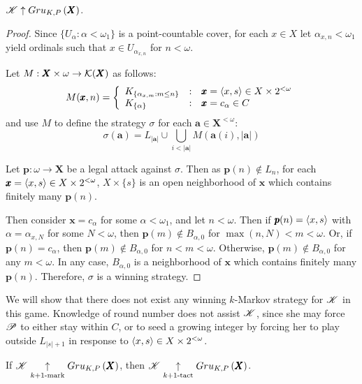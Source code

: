 \begin{thm}
  $\mathscr{K}\uparrow Gru_{K,P}\left({\pmb X}\right)$.
\end{thm}

\begin{proof}
  Since $\{U_\alpha:\alpha<\omega_1\}$ is a point-countable cover,
  for each $x\in X$ let $\alpha_{x,n}<\omega_1$ yield
  ordinals such that $x\in U_{\alpha_{x,n}}$ for $n<\omega$.

  Let $M:\pmb X\times \omega\to \mathcal{K}(\pmb X)$ as follows:
    \[
      M(\pmb x,n)
        =
      \left\{
        \begin{array}{lcl}
          K_{\{\alpha_{x,m}:m\leq n\}}
        & : &
          \pmb x = \langle x,s\rangle \in X\times 2^{<\omega}
        \\
          K_{\{\alpha\}}
        & : &
          \pmb x = c_\alpha \in C
        \end{array}
      \right.
    \]
  and use $M$ to define the strategy $\sigma$ for each $\pmb a\in\pmb X^{<\omega}$:
    \[
      \sigma(\pmb a)
        =
      L_{|\pmb a|}
        \cup
      \bigcup_{i< |\pmb a|}
      M(\pmb a(i),|\pmb a|)
    \]

  Let $\pmb p:\omega\to\pmb X$ be a legal attack against $\sigma$. Then as
  $\pmb p(n)\not\in L_n$, for each $\pmb x=\langle x,s\rangle\in X\times 2^{<\omega}$,
  $X\times\{s\}$ is an open neighborhood of $\pmb x$ which contains finitely
  many $\pmb p(n)$.

  Then consider $\pmb x=c_\alpha$ for some $\alpha<\omega_1$, and let $n<\omega$.
  Then if $\pmb p(n)=\langle x,s\rangle$ with $\alpha = \alpha_{x,N}$ for some $N<\omega$,
  then $\pmb p(m)\not\in B_{\alpha,0}$ for $\max(n,N)<m<\omega$.
  Or, if $\pmb p(n)=c_\alpha$, then
  $\pmb p(m)\not\in B_{\alpha,0}$ for $n<m<\omega$.
  Otherwise, $\pmb p(m)\not\in B_{\alpha,0}$ for any $m<\omega$.
  In any case, $B_{\alpha,0}$ is a neighborhood of $\pmb x$ which contains finitely
  many $\pmb p(n)$. Therefore, $\sigma$ is a winning strategy.
\end{proof}

We will show that there does not exist any winning $k$-Markov strategy for
$\mathscr{K}$ in this game. Knowledge of round number does not assist $\mathscr{K}$,
since she may force $\mathscr{P}$ to either stay within $C$, or to seed a growing
integer by forcing her to play outside $L_{|s|+1}$ in response to
$\langle x,s\rangle\in X\times 2^{<\omega}$.

\begin{lem}
  If $\mathscr{K}\underset{k+1\text{-mark}}{\uparrow}Gru_{K,P}\left({\pmb X}\right)$, then
  $\mathscr{K}\underset{k+1\text{-tact}}{\uparrow}Gru_{K,P}\left({\pmb X}\right)$.
\end{lem}

